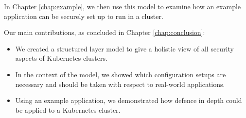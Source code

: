 In Chapter \ref{chap:example}, we then use this model to examine how an example application can be securely set up to run in a cluster.

Our main contributions, as concluded in Chapter \ref{chap:conclusion}:

\begin{itemize}
	\item We created a structured layer model to give a holistic view of all security aspects of Kubernetes clusters.
	\item In the context of the model, we showed which configuration setups are necessary and should be taken with respect to real-world applications.
	\item Using an example application, we demonstrated how defence in depth could be applied to a Kubernetes cluster.
\end{itemize}



